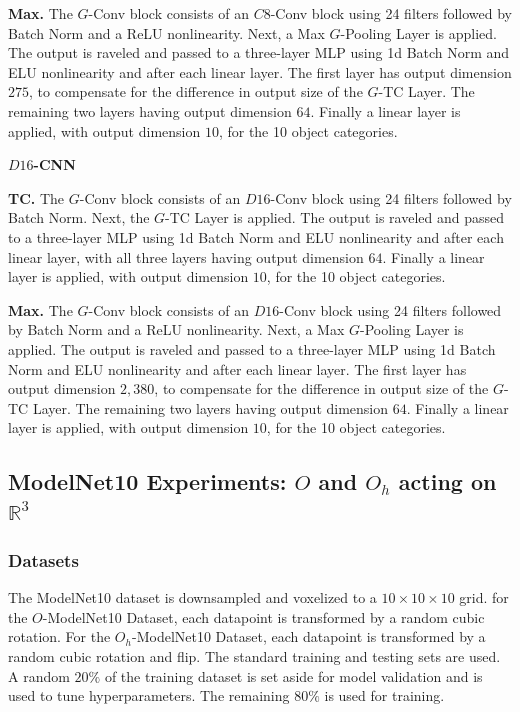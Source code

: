 \textbf{Max.} The $G$-Conv block consists of an $C8$-Conv block using 24 filters followed by Batch Norm and a ReLU nonlinearity. Next, a Max $G$-Pooling Layer is applied. The output is raveled and passed to a three-layer MLP using 1d Batch Norm and ELU nonlinearity and after each linear layer. The first layer has output dimension $275$, to compensate for the difference in output size of the $G$-TC Layer. The remaining two layers having output dimension $64$. Finally a linear layer is applied, with output dimension $10$, for the 10 object categories.

\textbf{$D16$-CNN}

\textbf{TC.} The $G$-Conv block consists of an $D16$-Conv block using 24 filters followed by Batch Norm. Next, the $G$-TC Layer is applied. The output is raveled and passed to a three-layer MLP using 1d Batch Norm and ELU nonlinearity and after each linear layer, with all three layers having output dimension $64$. Finally a linear layer is applied, with output dimension $10$, for the 10 object categories.


\textbf{Max.} The $G$-Conv block consists of an $D16$-Conv block using 24 filters followed by Batch Norm and a ReLU nonlinearity. Next, a Max $G$-Pooling Layer is applied. The output is raveled and passed to a three-layer MLP using 1d Batch Norm and ELU nonlinearity and after each linear layer. The first layer has output dimension $2,380$, to compensate for the difference in output size of the $G$-TC Layer. The remaining two layers having output dimension $64$. Finally a linear layer is applied, with output dimension $10$, for the 10 object categories.


\subsection{ModelNet10 Experiments: $O$ and $O_h$ acting on $\mathbb{R}^3$}

\subsubsection{Datasets}

The ModelNet10 dataset is downsampled and voxelized to a $10 \times 10 \times 10$ grid. for the $O$-ModelNet10 Dataset, each datapoint is transformed by a random cubic rotation. For the $O_h$-ModelNet10 Dataset, each datapoint is transformed by a random cubic rotation and flip. The standard training and testing sets are used. A random $20 \%$ of the training dataset is set aside for model validation and is used to tune hyperparameters. The remaining $80 \%$ is used for training.


